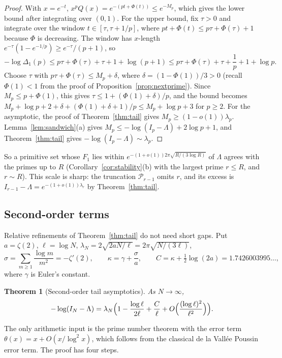 \documentclass[11pt]{article}
\newtheorem{theorem}{Theorem}[section]
\theoremstyle{remark}
\newcommand{\Prm}{\mathcal{P}}
\begin{document}
\begin{proof}
With $x=e^{-t}$, $x^pQ(x)=e^{-(pt+\Phi(t))}\le e^{-M_p}$, which gives the
lower bound after integrating over $(0,1)$. For the upper bound, fix
$\tau>0$ and integrate over the window $t\in[\tau,\tau+1/p]$, where
$pt+\Phi(t)\le p\tau+\Phi(\tau)+1$ because $\Phi$ is decreasing. The
window has $x$-length $e^{-\tau}(1-e^{-1/p})\ge e^{-\tau}/(p+1)$, so
\[
  -\log\Delta_1(p)\le p\tau+\Phi(\tau)+\tau+1+\log(p+1)
  \le p\tau+\Phi(\tau)+\tau+\frac1p+1+\log p .
\]
Choose $\tau$ with $p\tau+\Phi(\tau)\le M_p+\delta$, where
$\delta=(1-\Phi(1))/3>0$ (recall $\Phi(1)<1$ from the proof of
Proposition~\ref{prop:nextprime}). Since $M_p\le p+\Phi(1)$, this gives
$\tau\le1+(\Phi(1)+\delta)/p$, and the bound becomes
$M_p+\log p+2+\delta+(\Phi(1)+\delta+1)/p\le M_p+\log p+3$ for $p\ge2$.
For the asymptotic, the proof of Theorem~\ref{thm:tail} gives
$M_p\ge(1-o(1))\lambda_p$. Lemma~\ref{lem:sandwich}(a) gives
$M_p\le-\log(I_p-\Lambda)+2\log p+1$, and Theorem~\ref{thm:tail} gives
$-\log(I_p-\Lambda)\sim\lambda_p$.
\end{proof}

So a primitive set whose $F_1$ lies within
$e^{-(1+o(1))2\pi\sqrt{R/(3\log R)}}$ of $\Lambda$ agrees with the primes
up to $R$ (Corollary~\ref{cor:stability}(b) with the largest prime
$r\le R$, and $r\sim R$). This scale is sharp: the truncation
$\Prm_{r-1}$ omits $r$, and its excess is
$I_{r-1}-\Lambda=e^{-(1+o(1))\lambda_r}$ by Theorem~\ref{thm:tail}.

\subsection{Second-order terms}
Relative refinements of Theorem~\ref{thm:tail} do not need short gaps.
Put $a=\zeta(2)$, $\ell=\log N$, $\lambda_N=2\sqrt{2aN/\ell}
=2\pi\sqrt{N/(3\ell)}$,
\[
  \sigma=\sum_{m\ge1}\frac{\log m}{m^2}=-\zeta'(2),\qquad
  \kappa=\gamma+\frac{\sigma}{a},\qquad
  C=\kappa+\tfrac12\log(2a)=1.7426003995\ldots,
\]
where $\gamma$ is Euler's constant.

\begin{theorem}[Second-order tail asymptotics]\label{thm:second}
As $N\to\infty$,
\[
  -\log(I_N-\Lambda)=\lambda_N\Bigl(1-\frac{\log\ell}{2\ell}+\frac{C}{\ell}
  +O\Bigl(\frac{(\log\ell)^2}{\ell^2}\Bigr)\Bigr).
\]
\end{theorem}

The only arithmetic input is the prime number theorem with the error
term $\theta(x)=x+O(x/\log^2x)$, which follows from the classical
de la Vall\'ee Poussin error term. The proof has four steps.
\end{document}
